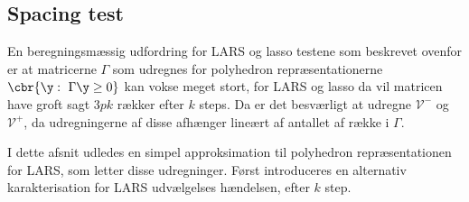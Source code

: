 \subsection{Spacing test}
En beregningsmæssig udfordring for LARS og lasso testene som beskrevet ovenfor er at matricerne \(\Gamma\) som udregnes for polyhedron repræsentationerne \(\cbr{\y : \ \Gamma \y \geq 0}\) kan vokse meget stort, for LARS og lasso da vil matricen have groft sagt \(3pk\) rækker efter \(k\) steps.
Da er det besværligt at udregne \(\mathcal{V}^-\) og \(\mathcal{V}^+\), da udregningerne af disse afhænger lineært af antallet af række i \(\Gamma\).

I dette afsnit udledes en simpel approksimation til polyhedron repræsentationen for LARS, som letter disse udregninger. 
Først introduceres en alternativ karakterisation for LARS udvælgelses hændelsen, efter \(k\) step.
%
